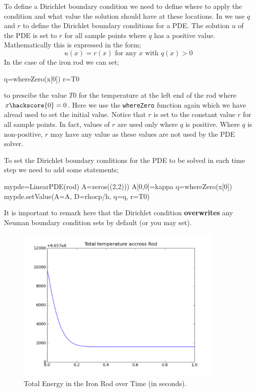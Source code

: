 To define a Dirichlet boundary condition we need to define where to apply the condition and what value the 
solution should have at these locations. In \esc we use $q$ and $r$ to define the Dirichlet boundary conditions
for a PDE. The solution $u$ of the PDE is set to $r$ for all sample points where $q$ has a positive value.
Mathematically this is expressed in the form;
\begin{equation}
  u(x) = r(x) \mbox{ for any } x \mbox{ with } q(x) > 0
\end{equation} 
In the case of the iron rod 
we can set;
\begin{python}
q=whereZero(x[0])
r=T0
\end{python}
to prescibe the value $T0$ for the temperature at the left end of the rod where $x\hackscore{0}=0$. 
Here we use the \verb|whereZero| function again which we have alread used to set the initial value.
Notice that $r$ is set to the constant value $r$ for all sample points. In fact, 
values of $r$ are used only where $q$ is positive. Where $q$ is non-positive,
$r$ may have any value as these values are not used by the PDE solver. 

To set the Dirichlet boundary conditions for the PDE to be solved in each time step we need
to add some statements;
\begin{python}
mypde=LinearPDE(rod)
A=zeros((2,2)))
A[0,0]=kappa
q=whereZero(x[0])
mypde.setValue(A=A, D=rhocp/h, q=q, r=T0)
\end{python}
It is important to remark here that the Dirichlet condition \textbf{overwrites} any Neuman boundary 
condition \esc sets by default (or you may set).  

\begin{figure}
\begin{center}
\includegraphics[width=4in]{figures/ttrodpyplot150}
\caption{Total Energy in the Iron Rod over Time (in seconds).}
\label{fig:onedheatout1 002} 
\end{center}
\end{figure}

